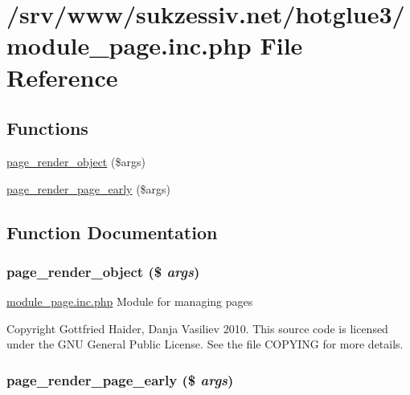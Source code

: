\hypertarget{module__page_8inc_8php}{
\section{/srv/www/sukzessiv.net/hotglue3/module\_\-page.inc.php File Reference}
\label{module__page_8inc_8php}
}
\subsection*{Functions}
\begin{CompactItemize}
\item 
\hyperlink{module__page_8inc_8php_53e7091b9a654d0d772cea6e3127820e}{page\_\-render\_\-object} (\$args)
\item 
\hyperlink{module__page_8inc_8php_80aff2ea069c7a2ba120e26bb218efa5}{page\_\-render\_\-page\_\-early} (\$args)
\end{CompactItemize}


\subsection{Function Documentation}
\hypertarget{module__page_8inc_8php_53e7091b9a654d0d772cea6e3127820e}{
\subsubsection[{page\_\-render\_\-object}]{\setlength{\rightskip}{0pt plus 5cm}page\_\-render\_\-object (\$ {\em args})}}
\label{module__page_8inc_8php_53e7091b9a654d0d772cea6e3127820e}


\hyperlink{module__page_8inc_8php}{module\_\-page.inc.php} Module for managing pages

Copyright Gottfried Haider, Danja Vasiliev 2010. This source code is licensed under the GNU General Public License. See the file COPYING for more details. \hypertarget{module__page_8inc_8php_80aff2ea069c7a2ba120e26bb218efa5}{
\subsubsection[{page\_\-render\_\-page\_\-early}]{\setlength{\rightskip}{0pt plus 5cm}page\_\-render\_\-page\_\-early (\$ {\em args})}}
\label{module__page_8inc_8php_80aff2ea069c7a2ba120e26bb218efa5}


